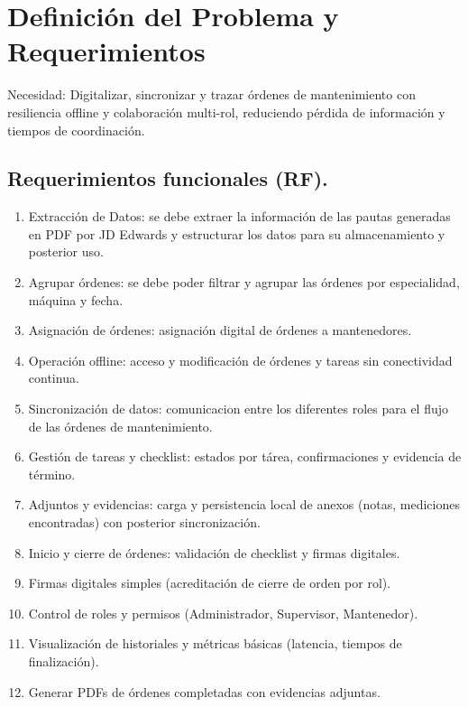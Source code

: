 \documentclass[10pt,a4paper]{report}
\begin{document}
\section*{Definición del Problema y Requerimientos}

Necesidad: Digitalizar, sincronizar y trazar órdenes de mantenimiento con resiliencia offline y colaboración multi-rol, reduciendo pérdida de información y tiempos de coordinación.

\subsection*{Requerimientos funcionales (RF).}
\begin{enumerate}
    \item [\textbf{RF1.}] Extracción de Datos: se debe extraer la información de las pautas generadas en PDF por JD Edwards y estructurar los datos para su almacenamiento y posterior uso. 
    \item [\textbf{RF2.}] Agrupar órdenes: se debe poder filtrar y agrupar las órdenes por especialidad, máquina y fecha.
    \item [\textbf{RF3.}] Asignación de órdenes: asignación digital de órdenes a mantenedores.
    \item [\textbf{RF4.}] Operación offline: acceso y modificación de órdenes y tareas sin conectividad continua. 
    \item [\textbf{RF5.}] Sincronización de datos: comunicacion entre los diferentes roles para el flujo de las órdenes de mantenimiento.
    \item [\textbf{RF6.}] Gestión de tareas y checklist: estados por tárea, confirmaciones y evidencia de término.
    \item [\textbf{RF7.}] Adjuntos y evidencias: carga y persistencia local de anexos (notas, mediciones encontradas) con posterior sincronización.
    \item [\textbf{RF8.}] Inicio y cierre de órdenes: validación de checklist y firmas digitales.
    \item [\textbf{RF9.}] Firmas digitales simples (acreditación de cierre de orden por rol).
    \item [\textbf{RF10.}] Control de roles y permisos (Administrador, Supervisor, Mantenedor).
    \item [\textbf{RF11.}] Visualización de historiales y métricas básicas (latencia, tiempos de finalización).
    \item [\textbf{RF12.}] Generar PDFs de órdenes completadas con evidencias adjuntas.
\end{enumerate}
\end{document}
